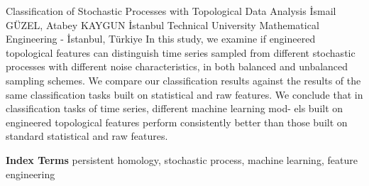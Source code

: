 
    \begin{abstract_online}{Classification of Stochastic Processes with Topological Data Analysis}{%
        İsmail GÜZEL, Atabey KAYGUN}{%
        }{%
        İstanbul Technical University Mathematical Engineering - İstanbul, Türkiye}
    In this study, we examine if engineered topological features can distinguish time series sampled from different stochastic processes with different noise characteristics, in both balanced and unbalanced sampling schemes. We compare our classification results against the results of the same classification tasks built on statistical and raw features. We conclude that in classification tasks of time series, different machine learning mod- els built on engineered topological features perform consistently better than those built on standard statistical and raw features. 
    
            \textbf{Index Terms} \newline{}persistent homology, stochastic process, machine learning, feature engineering
    \end{abstract_online}
    
